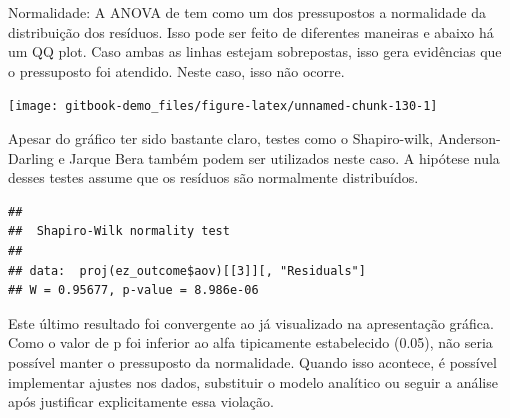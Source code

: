 \documentclass[
]{book}
\newenvironment{Shaded}{\begin{snugshade}}{\end{snugshade}}
\newcommand{\AttributeTok}[1]{\textcolor[rgb]{0.77,0.63,0.00}{#1}}
\newcommand{\DecValTok}[1]{\textcolor[rgb]{0.00,0.00,0.81}{#1}}
\newcommand{\FunctionTok}[1]{\textcolor[rgb]{0.00,0.00,0.00}{#1}}
\newcommand{\NormalTok}[1]{#1}
\newcommand{\SpecialCharTok}[1]{\textcolor[rgb]{0.00,0.00,0.00}{#1}}
\newcommand{\StringTok}[1]{\textcolor[rgb]{0.31,0.60,0.02}{#1}}
\begin{document}
Normalidade: A ANOVA de tem como um dos pressupostos a normalidade da distribuição dos resíduos. Isso pode ser feito de diferentes maneiras e abaixo há um QQ plot. Caso ambas as linhas estejam sobrepostas, isso gera evidências que o pressuposto foi atendido. Neste caso, isso não ocorre.

\begin{Shaded}
\end{Shaded}

\begin{center}\texttt{[image: gitbook-demo\_files/figure-latex/unnamed-chunk-130-1]} \end{center}

Apesar do gráfico ter sido bastante claro, testes como o Shapiro-wilk, Anderson-Darling e Jarque Bera também podem ser utilizados neste caso. A hipótese nula desses testes assume que os resíduos são normalmente distribuídos.

\begin{Shaded}
\end{Shaded}

\begin{verbatim}
## 
##  Shapiro-Wilk normality test
## 
## data:  proj(ez_outcome$aov)[[3]][, "Residuals"]
## W = 0.95677, p-value = 8.986e-06
\end{verbatim}

Este último resultado foi convergente ao já visualizado na apresentação gráfica. Como o valor de p foi inferior ao alfa tipicamente estabelecido (0.05), não seria possível manter o pressuposto da normalidade. Quando isso acontece, é possível implementar ajustes nos dados, substituir o modelo analítico ou seguir a análise após justificar explicitamente essa violação.
\end{document}
